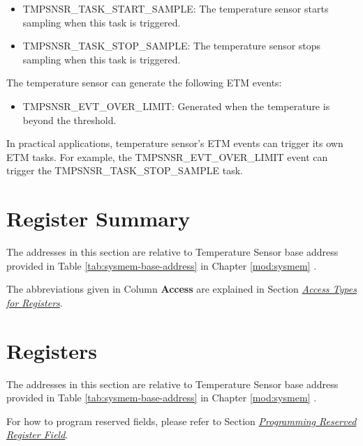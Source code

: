 \documentclass[main\_\_EN.tex]{subfiles}
\begin{document}
\begin{itemize}
    \item TMPSNSR\_TASK\_START\_SAMPLE: The temperature sensor starts sampling when this task is triggered.
    \item TMPSNSR\_TASK\_STOP\_SAMPLE: The temperature sensor stops sampling when this task is triggered.
\end{itemize}

The temperature sensor can generate the following ETM events:

\begin{itemize}
    \item TMPSNSR\_EVT\_OVER\_LIMIT: Generated when the temperature is beyond the threshold.
\end{itemize}

In practical applications, temperature sensor's ETM events can trigger its own ETM tasks. For example, the TMPSNSR\_EVT\_OVER\_LIMIT event can trigger the TMPSNSR\_TASK\_STOP\_SAMPLE task.




\newpage
\hypertarget{tmpsen-reg-summ}{}
\section{Register Summary}
\label{sec:tmpsen-reg-summ}

The addresses in this section are relative to Temperature Sensor base address provided in Table \ref{tab:sysmem-base-address} in Chapter \ref{mod:sysmem} \textit{}.

The abbreviations given in Column \textbf{Access} are explained in Section \hyperref[glossary-access-types]{\textit{Access Types for Registers}}.




\newpage
\section{Registers}

The addresses in this section are relative to Temperature Sensor base address provided in Table \ref{tab:sysmem-base-address} in Chapter \ref{mod:sysmem} \textit{}.

For how to program reserved fields, please refer to Section \hyperref[programming-reserved-field]{\textit{Programming Reserved Register Field}}.


\end{document}
